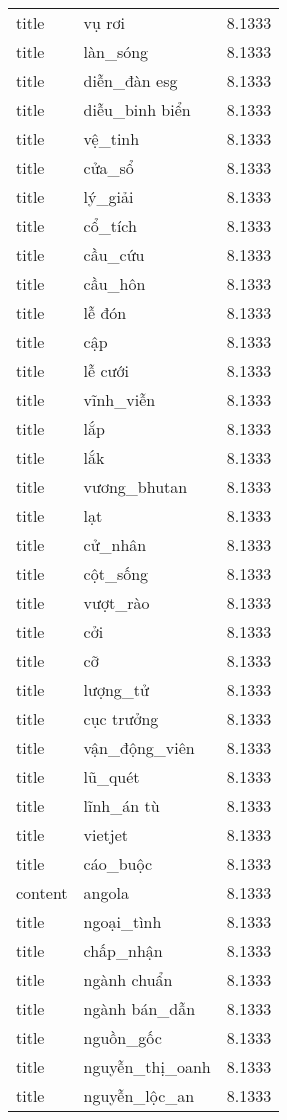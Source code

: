\documentclass{article}
\begin{document}
\begin{tabular}{lll}
title & vụ rơi & 8.1333\\
title & làn\_sóng & 8.1333\\
title & diễn\_đàn esg & 8.1333\\
title & diễu\_binh biển & 8.1333\\
title & vệ\_tinh & 8.1333\\
title & cửa\_sổ & 8.1333\\
title & lý\_giải & 8.1333\\
title & cổ\_tích & 8.1333\\
title & cầu\_cứu & 8.1333\\
title & cầu\_hôn & 8.1333\\
title & lễ đón & 8.1333\\
title & cập & 8.1333\\
title & lễ cưới & 8.1333\\
title & vĩnh\_viễn & 8.1333\\
title & lắp & 8.1333\\
title & lắk & 8.1333\\
title & vương\_bhutan & 8.1333\\
title & lạt & 8.1333\\
title & cử\_nhân & 8.1333\\
title & cột\_sống & 8.1333\\
title & vượt\_rào & 8.1333\\
title & cởi & 8.1333\\
title & cỡ & 8.1333\\
title & lượng\_tử & 8.1333\\
title & cục trưởng & 8.1333\\
title & vận\_động\_viên & 8.1333\\
title & lũ\_quét & 8.1333\\
title & lĩnh\_án tù & 8.1333\\
title & vietjet & 8.1333\\
title & cáo\_buộc & 8.1333\\
content & angola & 8.1333\\
title & ngoại\_tình & 8.1333\\
title & chấp\_nhận & 8.1333\\
title & ngành chuẩn & 8.1333\\
title & ngành bán\_dẫn & 8.1333\\
title & nguồn\_gốc & 8.1333\\
title & nguyễn\_thị\_oanh & 8.1333\\
title & nguyễn\_lộc\_an & 8.1333\\

\end{tabular}
\end{document}
